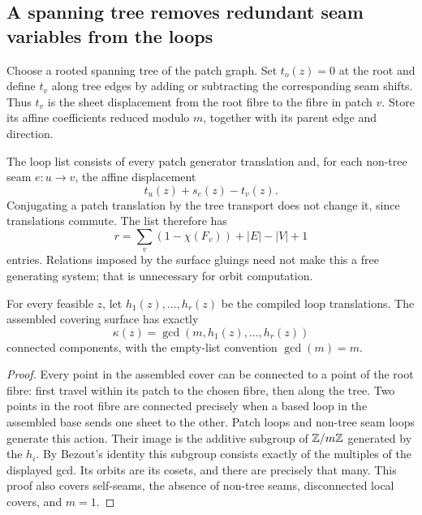 \subsection{A spanning tree removes redundant seam variables from the loops}

Choose a rooted spanning tree of the patch graph. Set $t_o(z)=0$ at the
root and define $t_v$ along tree edges by adding or subtracting the
corresponding seam shifts. Thus $t_v$ is the sheet displacement from the
root fibre to the fibre in patch $v$. Store its affine coefficients reduced
modulo $m$, together with its parent edge and direction.

The loop list consists of every patch generator translation and, for
each non-tree seam $e:u\to v$, the affine displacement
\begin{equation}
 t_u(z)+s_e(z)-t_v(z).\label{eq:cycle-voltage}
\end{equation}
Conjugating a patch translation by the tree transport does not change it,
since translations commute. The list therefore has
\[
 r=\sum_v(1-\chi(F_v))+|E|-|V|+1
\]
entries. Relations imposed by the surface gluings need not make this a
free generating system; that is unnecessary for orbit computation.

\begin{theorem}
\label{thm:surface-components}
For every feasible $z$, let $h_1(z),\ldots,h_r(z)$ be the compiled loop
translations. The assembled covering surface has exactly
\begin{equation}
 \kappa(z)=\gcd(m,h_1(z),\ldots,h_r(z))\label{eq:surface-count}
\end{equation}
connected components, with the empty-list convention $\gcd(m)=m$.
\end{theorem}
\begin{proof}
Every point in the assembled cover can be connected to a point of the
root fibre: first travel within its patch to the chosen fibre, then along
the tree. Two points in the root fibre are connected precisely when a
based loop in the assembled base sends one sheet to the other.
Patch loops and non-tree seam loops generate this action. Their image
is the additive subgroup of $\mathbb Z/m\mathbb Z$ generated by the $h_i$.
By Bezout's identity this subgroup consists exactly of the multiples of
the displayed gcd. Its orbits are its cosets, and there are precisely
that many. This proof also covers self-seams, the absence of non-tree
seams, disconnected local covers, and $m=1$.
\end{proof}

